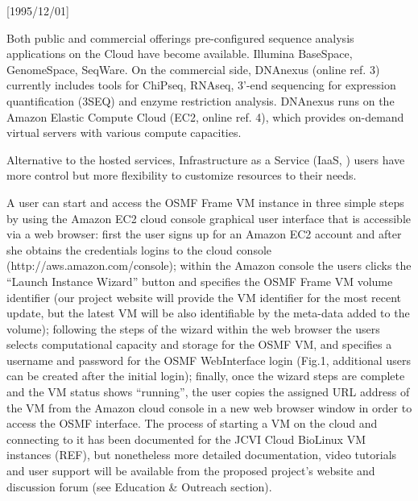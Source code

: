 \NeedsTeXFormat{LaTeX2e}[1995/12/01] \documentclass[10pt]{bmc_article}
\newenvironment{bmcformat}{\begin{raggedright}\baselineskip20pt\sloppy\setboolean{publ}{false}}{\end{raggedright}\baselineskip20pt\sloppy}
\begin{document}
\begin{bmcformat}
Both public and commercial offerings pre-configured sequence analysis applications on
the Cloud have become available. Illumina BaseSpace, GenomeSpace, SeqWare. On the commercial side, 
DNAnexus (online ref.  3) currently includes tools
for ChiPseq, RNAseq, 3'-end sequencing for expression quantification (3SEQ) and enzyme restriction analysis.
DNAnexus runs on the Amazon Elastic Compute Cloud (EC2, online ref. 4), which provides on-demand virtual
servers with various compute capacities. 

Alternative to the hosted services, Infrastructure as a Service (IaaS, \cite{}) users have more control but more flexibility 
to customize resources to their needs.

A user can start and access the OSMF Frame VM instance in three simple steps by using the Amazon EC2 cloud console graphical user interface that is accessible via a web browser: first the user signs up for an Amazon EC2 account and after she obtains the credentials logins to the cloud console (http://aws.amazon.com/console);  within the Amazon console the users clicks the “Launch Instance Wizard” button and specifies the OSMF Frame VM volume identifier (our project website will provide the VM identifier for the most recent update, but the latest VM will be also identifiable by the meta-data added to the volume); following the steps of the wizard within the web browser the users selects computational capacity and storage for the OSMF VM, and specifies a username and password for the OSMF WebInterface login (Fig.1, additional users can be created after the initial login); finally, once the wizard steps are complete and the VM status shows “running”, the user copies the assigned URL address of the VM from the Amazon cloud console in a new web browser window in order to access the OSMF interface. The process of starting a VM on the cloud and connecting to it has been documented for the JCVI Cloud BioLinux VM instances (REF), but nonetheless more detailed documentation, video tutorials and user support will be available from the proposed project's website and discussion forum (see Education & Outreach section).



\end{bmcformat}
\end{document}
